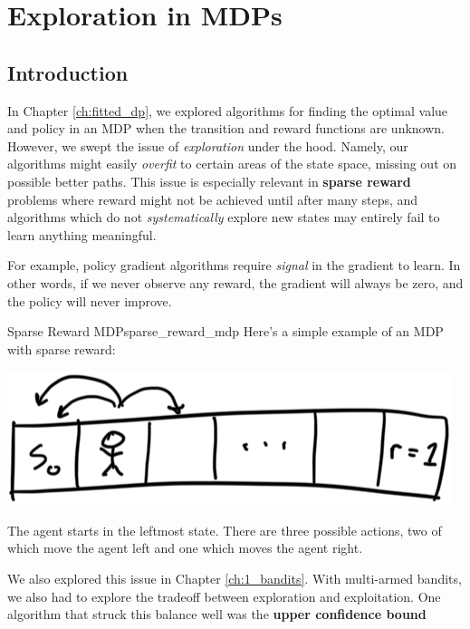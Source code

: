 \documentclass[\main/main]{subfiles}
\begin{document}
\tableofcontents

\chapter{Exploration in MDPs}

\section{Introduction}

In Chapter \ref{ch:fitted_dp}, we explored algorithms for finding the optimal value and policy in an MDP when the transition and reward functions are unknown.
However, we swept the issue of \emph{exploration} under the hood.
Namely, our algorithms might easily \emph{overfit} to certain areas of the state space,
missing out on possible better paths.
This issue is especially relevant in \textbf{sparse reward} problems where reward might not be achieved until after many steps,
and algorithms which do not \emph{systematically} explore new states may entirely fail to learn anything meaningful.

For example, policy gradient algorithms require \emph{signal} in the gradient to learn. In other words, if we never observe any reward, the gradient will always be zero, and the policy will never improve.

\begin{example}{Sparse Reward MDP}{sparse_reward_mdp}
    Here's a simple example of an MDP with sparse reward:

    \begin{center}
        \includegraphics{sparse_reward_mdp}
    \end{center}

    The agent starts in the leftmost state. There are three possible actions, two of which move the agent left and one which moves the agent right.
\end{example}

We also explored this issue in Chapter \ref{ch:1_bandits}.
With multi-armed bandits, we also had to explore the tradeoff between exploration and exploitation.
One algorithm that struck this balance well was the \textbf{upper confidence bound} 
\end{document}
